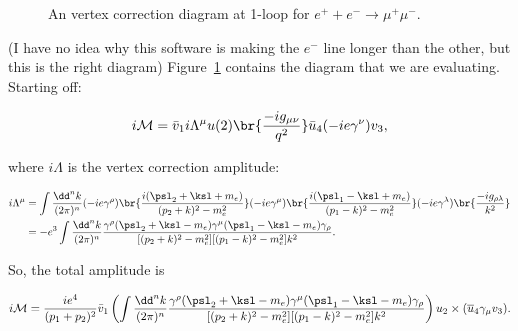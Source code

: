 \section{}



\begin{figure}[ht]
\centering

  
\caption{An vertex correction diagram at 1-loop for $e^++e^- \rightarrow \mu^+ \mu^-$.}
\label{fig:2}    
\end{figure}


(I have no idea why this software is making the $e^-$ line longer than the other, but this is the right diagram) Figure~\ref{fig:2} contains the diagram that we are evaluating. Starting off:

\begin{equation}
  i\mathcal{M} = \bar{v}_1 i\Lambda^{\mu}u(2) \br{\frac{-ig_{\mu\nu}}{q^2}} \bar{u}_4 (-ie\gamma^{\nu})v_3,
\end{equation}

where $i\Lambda$ is the vertex correction amplitude:

\begin{align}
  i\Lambda^{\mu} &= \int \frac{\dd^nk}{(2\pi)^n}(-ie\gamma^{\rho})\br{\frac{i(\psl_2 + \ksl + m_e)}{(p_2+k)^2 - m_e^2}}(-ie\gamma^{\mu})\br{\frac{i(\psl_1 - \ksl + m_e)}{(p_1-k)^2 - m_e^2}}(-ie\gamma^{\lambda})\br{\frac{-ig_{\rho\lambda}}{k^2}} \\
                 &= -e^3 \int \frac{\dd^nk}{(2\pi)^n} \frac{\gamma^{\rho}(\psl_2 + \ksl - m_e)\gamma^{\mu}(\psl_1 - \ksl - m_e)\gamma_{\rho}}{[(p_2+k)^2 - m_e^2][(p_1-k)^2 - m_e^2]k^2}.
\end{align}

So, the total amplitude is

\begin{equation}
  i\mathcal{M} = \frac{ie^4}{(p_1+p_2)^2}  \bar{v}_1\left(\int \frac{\dd^nk}{(2\pi)^n} \frac{\gamma^{\rho}(\psl_2 + \ksl - m_e)\gamma^{\mu}(\psl_1 - \ksl - m_e)\gamma_{\rho}}{[(p_2+k)^2 - m_e^2][(p_1-k)^2 - m_e^2]k^2}\right)u_2 \times (\overline{u}_4\gamma_\mu v_3).
\end{equation}




